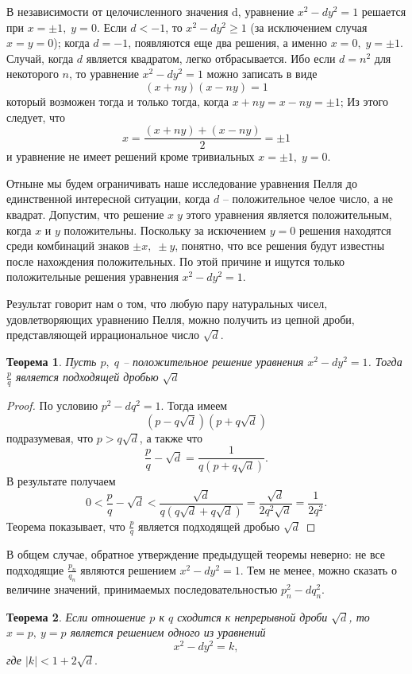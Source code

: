 \documentclass[twoside,12pt]{article}
\newtheorem{theorem}{Теорема}
\begin{document}
\par В независимости от целочисленного значения d, уравнение $x^2 - dy^2 = 1 $ решается при $x = \pm 1,\; y = 0 $. Если $d < -1$, то $x^2 - dy^2 \geq 1 $ (за исключением случая $x = y = 0 $); когда $d = -1 $, появляются еще два решения, а именно $x=0,\; y = \pm 1 $. Случай, когда $d$ является квадратом, легко отбрасывается.  Ибо если  $d = n^2$ для некоторого $n$, то уравнение $x^2 - dy^2 = 1$ можно записать в виде 
\[(x + ny)(x-ny)=1 \] 
\noindent который возможен тогда и только тогда, когда $x+ny=x-ny=\pm 1$; Из этого следует, что 
\[x=\frac{(x + ny) + (x - ny) }{2} =\pm 1\]
\noindent и уравнение не имеет решений кроме тривиальных $x = \pm 1, \; y = 0$.
\par Отныне мы будем ограничивать наше исследование уравнения Пелля до единственной интересной ситуации, когда $d$ -- положительное челое число, а не квадрат. Допустим, что решение $x \; y$ этого уравнения является положительным, когда $x$ и $y$ положительны. Поскольку за искючением $y=0$ решения находятся среди комбинаций знаков $\pm x, \; \pm y $, понятно, что все решения будут известны после нахождения положительных. По этой причине и ищутся только положительные решения уравнения $x^2 - dy^2 = 1$.
\par Результат говорит нам о том, что любую пару натуральных чисел, удовлетворяющих уравнению Пелля, можно получить из цепной дроби, представляющей иррациональное число $\sqrt d$. 
\begin{theorem}
\textit{Пусть $p,\; q$ -- положительное решение уравнения $x^2 - dy^2 = 1$. Тогда $\frac{p}{q}$ является подходящей дробью $\sqrt{d} $}
\end{theorem} 
\begin{proof}  По условию $p^2 - dq^2 = 1$. Тогда имеем 
\[(p-q\sqrt{d})(p+q\sqrt{d}) \] 
\noindent подразумевая, что $p>q\sqrt{d}$, а также что
\[ \frac{p}{q} - \sqrt{d} = \frac{1}{q(p + q\sqrt{d})}.\]
В результате получаем
\[ 0 < \frac{p}{q} - \sqrt{d} < \frac{\sqrt{d}}{q(q\sqrt{d} +q\sqrt{d})} = \frac{\sqrt{d}}{2q^2\sqrt{d}} = \frac{1}{2q^2}.\]
\noindent Теорема показывает, что $\frac{p}{q}$ является подходящей дробью $\sqrt{d} $ 
\end{proof}
\par В общем случае, обратное утверждение предыдущей теоремы неверно: не все подходящие $\frac{p_n}{q_n}$ являются решением $x^2 - dy^2 = 1$. Тем не менее, можно сказать о величине значений, принимаемых последовательностью $p_n^2 - dq_n^2.$
\begin{theorem}
\textit{ Если отношение $p$ к $q$ сходится к непрерывной дроби $\sqrt{d}$, то $x=p, \: y=p$ является решением одного из уравнений }
\[x^2 - dy^2 = k, \]
\noindent где $|k| < 1 + 2\sqrt{d}.$ 
\end{theorem}
\end{document}
